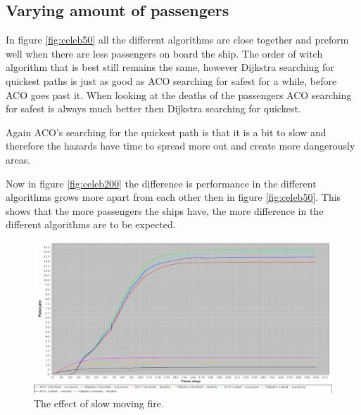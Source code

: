 \subsection{Varying amount of passengers}

In figure \ref{fig:celeb50} all the different algorithms are close together and preform well when there are less passengers on board the ship. The order of witch algorithm that is best still remains the same, however Dijkstra searching for quickest paths is just as good as ACO searching for safest for a while, before ACO goes past it. When looking at the deaths of the passengers ACO searching for safest is always much better then Dijkstra searching for quickest.

Again ACO's searching for the quickest path is that it is a bit to slow and therefore the hazards have time to spread more out and create more dangerously areas.

Now in figure \ref{fig:celeb200} the difference is performance in the different algorithms grows more apart from each other then in figure \ref{fig:celeb50}. This shows that the more passengers the ships have, the more difference in the different algorithms are to be expected.

\begin{figure} [h]
\centering
\hspace*{-1.0in}
\includegraphics[scale=0.35]{images/Graph-using-200-rounds-140-passangers-slow-fire.png}
\caption{The effect of slow moving fire.}
\label{fig:celebSfire}
\end{figure}

